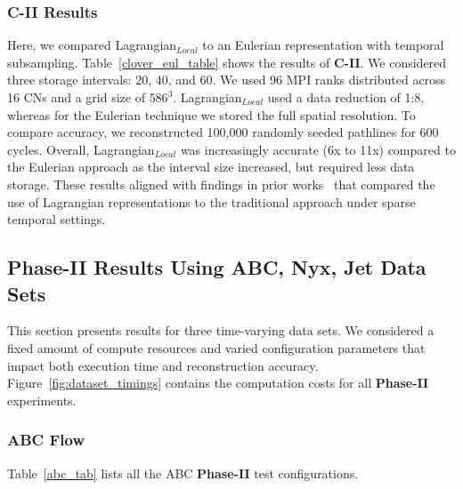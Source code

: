 \subsubsection{C-II Results} 
Here, we compared Lagrangian$_{Local}$ to an Eulerian representation with temporal subsampling.
%
Table~\ref{clover_eul_table} shows the results of \textbf{C-II}.
%
We considered three storage intervals: 20, 40, and 60.
%
We used 96 MPI ranks distributed across 16 CNs and a grid size of $586^3$.
%
Lagrangian$_{Local}$ used a data reduction of 1:8, whereas for the Eulerian technique we stored the full spatial resolution.
%
To compare accuracy, we reconstructed 100,000 randomly seeded pathlines for 600 cycles.
%
%
Overall, Lagrangian$_{Local}$ was increasingly accurate (6x to 11x) compared to the Eulerian approach as the interval size increased, but required less data storage.
%
These results aligned with findings in prior works~\cite{agranovsky2014improved, sane2018revisiting} that compared the use of Lagrangian representations to the traditional approach under sparse temporal settings.


\vspace{-2mm}
\subsection{Phase-II Results Using ABC, Nyx, Jet Data Sets}
This section presents results for three time-varying data sets.
%
We considered a fixed amount of compute resources and varied configuration parameters that impact both execution time and reconstruction accuracy.
%
Figure~\ref{fig:dataset_timings} contains the computation costs for all \textbf{Phase-II} experiments.
%

\label{sec:experiment2}
\vspace{-2mm}
\subsubsection{ABC Flow}
\label{sec:abc}

Table~\ref{abc_tab} lists all the ABC \textbf{Phase-II} test configurations.
%



